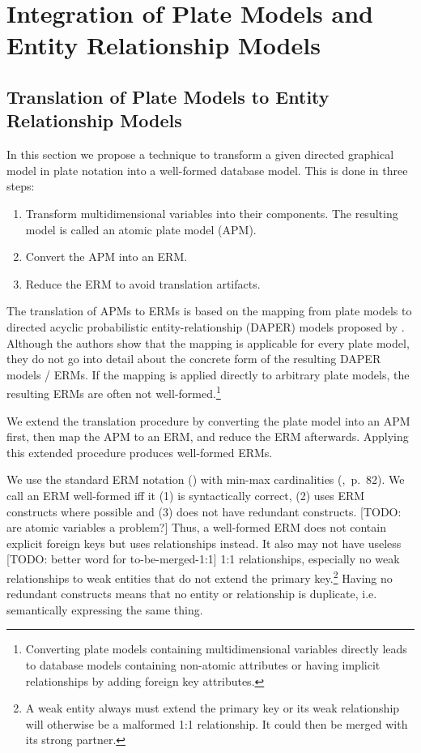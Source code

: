 \section{Integration of Plate Models and Entity Relationship Models}

\subsection{Translation of Plate Models to Entity Relationship Models}

In this section we propose a technique to transform a given directed graphical model in plate notation into a well-formed database model. This is done in three steps:
\begin{enumerate}
\item Transform multidimensional variables into their components. The resulting model is called an atomic plate model (APM).
\item\label{itm:apm2erm} Convert the APM into an ERM.
\item Reduce the ERM to avoid translation artifacts.
\end{enumerate}
The translation of APMs to ERMs is based on the mapping from plate models to directed acyclic probabilistic entity-relationship (DAPER) models proposed by \textcite{heckerman2007probabilistic}. Although the authors show that the mapping is applicable for every plate model, they do not go into detail about the concrete form of the resulting DAPER models / ERMs. If the mapping is applied directly to arbitrary plate models, the resulting ERMs are often not well-formed.\footnote{Converting plate models containing multidimensional variables directly leads to database models containing non-atomic attributes or having implicit relationships by adding foreign key attributes.}

We extend the translation procedure by converting the plate model into an APM first, then map the APM to an ERM, and reduce the ERM afterwards. Applying this extended procedure produces well-formed ERMs.

We use the standard ERM notation (\cite{chen1976entity}) with min-max cardinalities (\cite{elmasri2007database},~p.~82). We call an ERM well-formed iff it (1) is syntactically correct, (2) uses ERM constructs where possible and (3) does not have redundant constructs. [TODO: are atomic variables a problem?] Thus, a well-formed ERM does not contain explicit foreign keys but uses relationships instead. It also may not have useless [TODO: better word for to-be-merged-1:1] 1:1 relationships, especially no weak relationships to weak entities that do not extend the primary key.\footnote{A weak entity always must extend the primary key or its weak relationship will otherwise be a malformed 1:1 relationship. It could then be merged with its strong partner.} Having no redundant constructs means that no entity or relationship is duplicate, i.e. semantically expressing the same thing.


